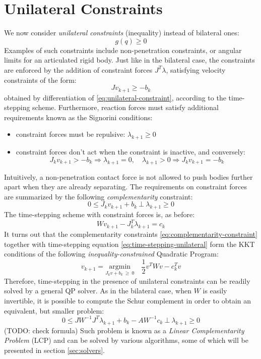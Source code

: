 \documentclass{article}
\newcommand{\half}{\frac{1}{2}}
\newcommand{\inv}[1]{#1^{-1}}
\newcommand{\argmin}[1]{\underset{#1}{\textrm{argmin}}}
\begin{document}
\section{Unilateral Constraints}
\label{sec:unilateral-constraints}
%
We now consider \emph{unilateral constraints} (inequality) instead of
bilateral ones:
%
\begin{equation}
  \label{eq:unilateral-constraint}
  g(q) \geq 0
\end{equation}
%
Examples of such constraints include non-penetration constraints, or
angular limits for an articulated rigid body. Just like in the
bilateral case, the constraints are enforced by the addition of
constraint forces $J^T \lambda$, satisfying velocity constraints of
the form:
%
\begin{equation}
  J v_{k+1} \geq -b_k
\end{equation}
%
obtained by differentiation of \eqref{eq:unilateral-constraint},
according to the time-stepping scheme. Furthermore, reaction forces
must satisfy additional requirements known as the Signorini
conditions:
%
\begin{itemize}
\item constraint forces must be repulsive: $\lambda_{k+1} \geq 0$
\item constraint forces don't act when the constraint is inactive, and
  conversely:
  \[ J_k v_{k+1} > -b_k \Rightarrow \lambda_{k+1} = 0, \quad \lambda_{k+1} > 0 \Rightarrow J_k v_{k+1} = -b_k \]
\end{itemize}
%
Intuitively, a non-penetration contact force is not allowed to push
bodies further apart when they are already separating. The
requirements on constraint forces are summarized by the following
\emph{complementarity} constraint:
%
\begin{equation}
  \label{eq:complementarity-constraint}
  0 \leq J_k v_{k+1} + b_k \ \bot \ \lambda_{k+1} \geq 0 
\end{equation}
%
The time-stepping scheme with constraint forces is, as before:
%
\begin{equation}
  \label{eq:time-stepping-unilateral}
  W v_{k+1} -J_k^T \lambda_{k+1} = c_k
\end{equation}
%
It turns out that the complementarity constraints
\eqref{eq:complementarity-constraint} together with time-stepping
equation \eqref{eq:time-stepping-unilateral} form the KKT conditions
of the following \emph{inequality-constrained} Quadratic Program:
%
\begin{equation}
  v_{k+1} = \argmin{J_kv + b_k\  \geq\  0} \quad \half v^TWv - c_k^T v
\end{equation}
%
Therefore, time-stepping in the presence of unilateral constraints can
be readily solved by a general QP solver. As in the bilateral case,
when $W$ is easily invertible, it is possible to compute the Schur
complement in order to obtain an equivalent, but smaller problem:
%
\begin{equation}
  \label{eq:lcp}
  0 \leq J\inv{W}J^T \lambda_{k+1} + b_k - A\inv{W} c_k\ \bot \ \lambda_{k+1} \geq 0 
\end{equation}
%
(TODO: check formula) Such problem is known as a \emph{Linear
  Complementarity Problem} (LCP) and can be solved by various
algorithms, some of which will be presented in section
\ref{sec:solvers}.
%
\end{document}
